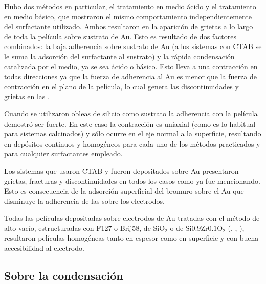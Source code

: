 			Hubo dos métodos en particular, el tratamiento en medio ácido y el tratamiento en medio básico, que mostraron el mismo comportamiento independientemente del surfactante utilizado. Ambos resultaron en la aparición de grietas a lo largo de toda la película sobre sustrato de Au. Esto es resultado de dos factores combinados: la baja adherencia sobre sustrato de Au (a los sistemas con CTAB se le suma la adsorción del surfactante al sustrato) y la rápida condensación catalizada por el medio, ya se sea ácido o básico. Esto lleva a una contracción en todas direcciones ya que la fuerza de adherencia al Au es menor que la fuerza de contracción en el plano de la película, lo cual genera las discontinuidades y grietas en las \pdm. 

			Cuando se utilizaron obleas de silicio como sustrato la adherencia con la película demostró ser fuerte. En este caso la contracción es uniaxial (como es lo habitual para sistemas calcinados) y sólo ocurre en el eje normal a la superficie, resultando en depósitos continuos y homogéneos para cada uno de los métodos practicados y para cualquier surfactantes empleado.

			Los sistemas que usaron CTAB y fueron depositados sobre Au presentaron grietas, fracturas y discontinuidades en todos los casos como ya fue mencionando. Esto es consecuencia de la adsorción superficial del bromuro sobre el Au que disminuye la adherencia de las \pdm\space sobre los electrodos.
			
			Todas las películas depositadas sobre electrodos de Au tratadas con el método de alto vacío, estructuradas con F127 o Brij58, de SiO$_2$ o de Si$0.9$Zr$0.1$O$_2$ (\pdmF, \pdmZ, \pdmZB), resultaron películas homogéneas tanto en espesor como en superficie y con buena accesibilidad al electrodo.

	\subsection{Sobre la condensación}

